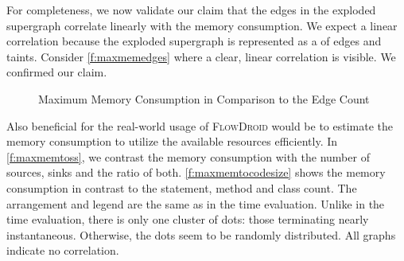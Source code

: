 \documentclass[../draft.tex]{subfiles}
\begin{document}
    For completeness, we now validate our claim that the edges in the exploded supergraph correlate linearly with the memory consumption.
    We expect a linear correlation because the exploded supergraph is represented as a  of edges and taints. 
    Consider \autoref{f:maxmemedges} where a clear, linear correlation is visible.
    We confirmed our claim.

    \begin{figure}[tbp]
        \begin{subfigure}[b]{\textwidth}
            \centering
            \begin{subfigure}[]{0.45\textwidth}
                \centering
                \resizebox{\columnwidth}{!}{
                    
                }
            \end{subfigure}
            \qquad
            \begin{subfigure}[]{0.45\textwidth}
                \centering
                \resizebox{\columnwidth}{!}{
                    
                }
            \end{subfigure}
        \end{subfigure}
        \caption{Maximum Memory Consumption in Comparison to the Edge Count}
        \label{f:maxmemedges}
    \end{figure}

    Also beneficial for the real-world usage of \textsc{FlowDroid} would be to estimate the memory consumption to utilize the available resources efficiently.
    In \autoref{f:maxmemtoss}, we contrast the memory consumption with the number of sources, sinks and the ratio of both.
    \autoref{f:maxmemtocodesize} shows the memory consumption in contrast to the statement, method and class count.
    The arrangement and legend are the same as in the time evaluation.
    Unlike in the time evaluation, there is only one cluster of dots: those terminating nearly instantaneous. 
    Otherwise, the dots seem to be randomly distributed. 
    All graphs indicate no correlation.
\end{document}

